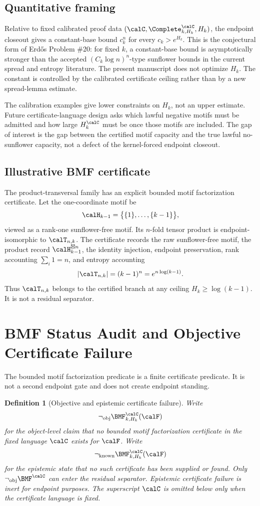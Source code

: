 \documentclass[11pt]{article}
\newtheorem{definition}[theorem]{Definition}
\begin{document}
\subsection{Quantitative framing}
Relative to fixed calibrated proof data \((\calC,\Complete^{\calC}_{k,H_k},H_k)\), the endpoint closeout gives a constant-base bound \(c_k^n\) for every \(c_k>e^{H_k}\).  This is the conjectural form of Erdős Problem \#20: for fixed \(k\), a constant-base bound is asymptotically stronger than the accepted \((C_k\log n)^n\)-type sunflower bounds in the current spread and entropy literature.  The present manuscript does not optimize \(H_k\).  The constant is controlled by the calibrated certificate ceiling rather than by a new spread-lemma estimate.

The calibration examples give lower constraints on \(H_k\), not an upper estimate.  Future certificate-language design asks which lawful negative motifs must be admitted and how large \(H_k^{\calC}\) must be once those motifs are included.  The gap of interest is the gap between the certified motif capacity and the true lawful no-sunflower capacity, not a defect of the kernel-forced endpoint closeout.

\subsection{Illustrative BMF certificate}
The product-transversal family has an explicit bounded motif factorization certificate.  Let the one-coordinate motif be
\[
  \calH_{k-1}=\bigl\{\{1\},\dots,\{k-1\}\bigr\},
\]
viewed as a rank-one sunflower-free motif.  Its \(n\)-fold tensor product is endpoint-isomorphic to \(\calT_{n,k}\).  The certificate records the raw sunflower-free motif, the product record \(\calH_{k-1}^{\boxtimes n}\), the identity injection, endpoint preservation, rank accounting \(\sum_i1=n\), and entropy accounting
\[
  |\calT_{n,k}|=(k-1)^n=e^{n\log(k-1)}.
\]
Thus \(\calT_{n,k}\) belongs to the certified branch at any ceiling \(H_k\ge\log(k-1)\).  It is not a residual separator.

\section{BMF Status Audit and Objective Certificate Failure}

The bounded motif factorization predicate is a finite certificate predicate.  It is not a second endpoint gate and does not create endpoint standing.

\begin{definition}[Objective and epistemic certificate failure]
Write
\[
  \neg_{\mathrm{obj}}\BMF^{\calC}_{k,H_k}(\calF)
\]
for the object-level claim that no bounded motif factorization certificate in the fixed language \(\calC\) exists for \(\calF\).  Write
\[
  \neg_{\mathrm{known}}\BMF^{\calC}_{k,H_k}(\calF)
\]
for the epistemic state that no such certificate has been supplied or found.
Only \(\neg_{\mathrm{obj}}\BMF^{\calC}\) can enter the residual separator.  Epistemic certificate failure is inert for endpoint purposes.  The superscript \(\calC\) is omitted below only when the certificate language is fixed.
\end{definition}
\end{document}
